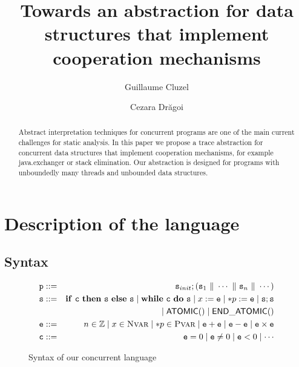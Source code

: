 \documentclass[runningheads]{llncs}
\newcommand\prule{\mathtt{p}}
\newcommand\srule{\mathtt{s}}
\newcommand{\erule}{\mathtt{e}}
\newcommand{\crule}{\mathtt{c}}
\newcommand{\ifinst}{\mathbf{if}}
\newcommand{\theninst}{\mathbf{then}}
\newcommand{\elseinst}{\mathbf{else}}
\newcommand{\whileinst}{\mathbf{while}}
\newcommand{\doinst}{\mathbf{do}}
\newcommand{\atomicbegin}{\mathsf{ATOMIC()}}
\newcommand{\atomicend}{\mathsf{END\_ATOMIC()}}
\newcommand{\Integer}{\mathbb Z}
\newcommand{\parallelcomposition}{\Vert}
\begin{document}
\title{Towards an abstraction for data structures that implement cooperation mechanisms }
%
%
\author{Guillaume Cluzel \and
Cezara Dr\u{a}goi}
%
%
%
\maketitle              %
%
\begin{abstract}

Abstract interpretation techniques for concurrent programs are one of the main current challenges for static analysis. 
In this paper we propose a trace abstraction for concurrent data structures that implement cooperation mechanisms, for example java.exchanger or stack elimination. 
Our abstraction is designed for programs with unboundedly many threads and unbounded data structures. 

\end{abstract}








  
   


  
  
  \section{Description of the language}
  \label{sec:syntax}
 
  \subsection{Syntax}
  
    \begin{figure}
    \begin{eqnarray*}
      \prule & ::= & \srule_{init} ; (\srule_1 \ \parallelcomposition \ \cdots \ \parallelcomposition \ \srule_n \ \parallelcomposition \ \cdots)\\
      \srule & ::= & \ifinst\ \crule\ \theninst \ {\srule} \ \elseinst \ {\srule} \mid 
      				\whileinst \ \crule \ \doinst \ {\srule} \mid 
      				x := \erule \mid *p := \erule \mid
      				\srule ; \srule \\
      				& & \mid \atomicbegin \mid \atomicend \\
      \erule & ::= & n \in \Integer \mid x \in \nvars \mid *p \in \pvars \mid
      			  \erule + \erule \mid \erule - \erule \mid \erule \times \erule \\
      \crule & ::= & \erule = 0 \mid \erule \neq 0 \mid \erule < 0 \mid \cdots
    \end{eqnarray*}
    \caption{Syntax of our concurrent language}
    \label{fig:syntax}
  \end{figure}
 
\end{document}

